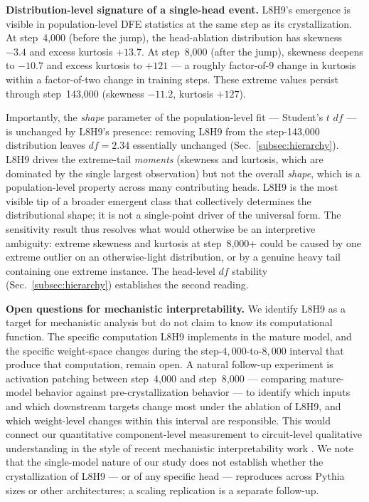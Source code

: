 \documentclass{article}
\begin{document}
\textbf{Distribution-level signature of a single-head event.} L8H9's emergence is visible in population-level DFE statistics at the same step as its crystallization. At step~4,000 (before the jump), the head-ablation distribution has skewness $-3.4$ and excess kurtosis $+13.7$. At step~8,000 (after the jump), skewness deepens to $-10.7$ and excess kurtosis to $+121$ --- a roughly factor-of-$9$ change in kurtosis within a factor-of-two change in training steps. These extreme values persist through step~143,000 (skewness $-11.2$, kurtosis $+127$). 

Importantly, the \emph{shape} parameter of the population-level fit --- Student's $t$ $df$ --- is unchanged by L8H9's presence: removing L8H9 from the step-143,000 distribution leaves $df = 2.34$ essentially unchanged (Sec.~\ref{subsec:hierarchy}). L8H9 drives the extreme-tail \emph{moments} (skewness and kurtosis, which are dominated by the single largest observation) but not the overall \emph{shape}, which is a population-level property across many contributing heads. L8H9 is the most visible tip of a broader emergent class that collectively determines the distributional shape; it is not a single-point driver of the universal form. The sensitivity result thus resolves what would otherwise be an interpretive ambiguity: extreme skewness and kurtosis at step~8,000+ could be caused by one extreme outlier on an otherwise-light distribution, or by a genuine heavy tail containing one extreme instance. The head-level $df$ stability (Sec.~\ref{subsec:hierarchy}) establishes the second reading.

\textbf{Open questions for mechanistic interpretability.} We identify L8H9 as a target for mechanistic analysis but do not claim to know its computational function. The specific computation L8H9 implements in the mature model, and the specific weight-space changes during the step-$4{,}000$-to-$8{,}000$ interval that produce that computation, remain open. A natural follow-up experiment is activation patching between step~4,000 and step~8,000 --- comparing mature-model behavior against pre-crystallization behavior --- to identify which inputs and which downstream targets change most under the ablation of L8H9, and which weight-level changes within this interval are responsible. This would connect our quantitative component-level measurement to circuit-level qualitative understanding in the style of recent mechanistic interpretability work \citep{olsson2022induction, wang2023interpretability, conmy2023automated}. We note that the single-model nature of our study does not establish whether the crystallization of L8H9 --- or of any specific head --- reproduces across Pythia sizes or other architectures; a scaling replication is a separate follow-up.
\end{document}
